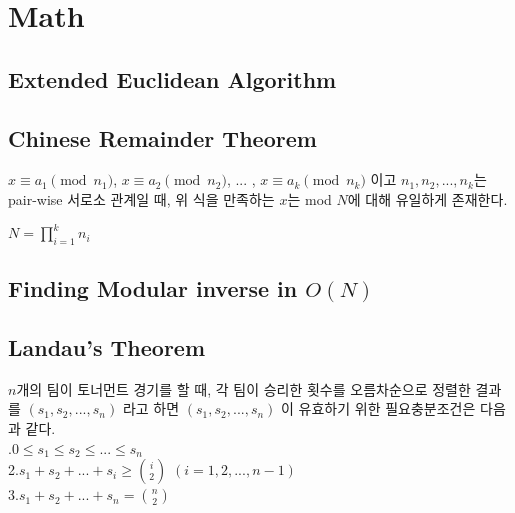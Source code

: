 \documentclass[10pt,landscape,a4paper,twocolumn]{article}
\begin{document}
\iffalse
\subsection{Plane Sweeping with Segment Tree}
시간복잡도 : $O(N\log{N})$

\fi



\section{Math}
\subsection{Extended Euclidean Algorithm}


\subsection{Chinese Remainder Theorem}
$x \equiv a_1 \pmod{n_1}$, $x \equiv a_2 \pmod{n_2}$, ... , $x \equiv a_k \pmod{n_k}$ 이고 $n_1, n_2, ... , n_k$는 pair-wise 서로소 관계일 때, 위 식을 만족하는 $x$는 mod $N$에 대해 유일하게 존재한다.\\
\begin{large}
$N = \prod_{i=1}^k {n_i}$
\end{large}


\subsection{Finding Modular inverse in $O(N)$}


\subsection{Landau's Theorem}
$n$개의 팀이 토너먼트 경기를 할 때, 각 팀이 승리한 횟수를 오름차순으로 정렬한 결과를 $(s_1,s_2, ... , s_n)$ 라고 하면 $(s_1,s_2, ... , s_n)$ 이 유효하기 위한 필요충분조건은 다음과 같다.\\
.\hspace{1em}$0 \le s_1 \le s_2 \le ... \le s_n$\\
2.\hspace{1em}$s_1+s_2+ ...+s_i \ge {i \choose 2}$ \hspace{1em}$(i=1,2,...,n-1)$\\
3.\hspace{1em}$s_1+s_2+ ...+s_n = {n \choose 2}$\\
\end{document}
